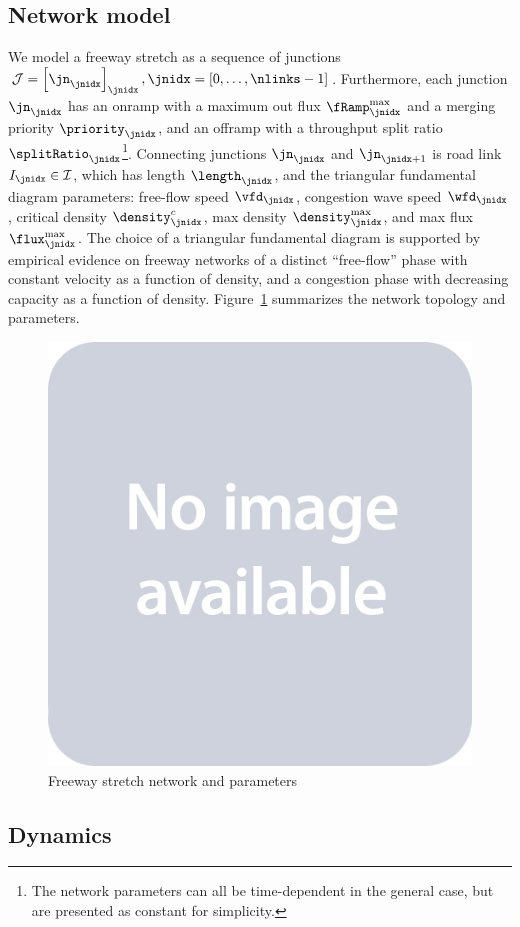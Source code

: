 \subsection{Network model} %
\label{sub:network_model}



We model a freeway stretch as a sequence of junctions $\junctions=\seq{\jn}{\jnidx},\jnidx=\left[0,\ldots,\nlinks -1\right]$.
Furthermore, each junction $\jn_{\jnidx}$ has an onramp with 
a maximum out flux $\rampMax_{\jnidx}$
and a merging priority $\priority_{\jnidx}$, and an offramp with
a throughput split ratio $\splitRatio_{\jnidx}$\footnote{The network parameters can all be time-dependent in the general case, but are presented as constant for simplicity.}. Connecting junctions $\jn_{\jnidx}$ and $\jn_{\jnidx+1}$ is road link $\link_{\jnidx}\in\links$, which has length $\length_\jnidx$, and the triangular fundamental diagram parameters:
free-flow speed $\vfd_{\jnidx}$, 
congestion wave speed $\wfd_{\jnidx}$, 
critical density $\pcfd_{\jnidx}$, 
max density $\pmfd_{\jnidx}$, and
max flux $\fmfd_{\jnidx}$. The choice of a triangular fundamental diagram is supported by empirical evidence on freeway networks of a distinct ``free-flow'' phase with constant velocity as a function of density, and a congestion phase with decreasing capacity as a function of density. Figure~\ref{fig:freeway-network} summarizes the network topology and parameters.

\begin{figure}
\centering
\includegraphics[width=.25\columnwidth]{figures/placeholder}
\caption{Freeway stretch network and parameters}
\label{fig:freeway-network}
\end{figure}

\subsection{Dynamics} %
\label{sub:dynamics}

